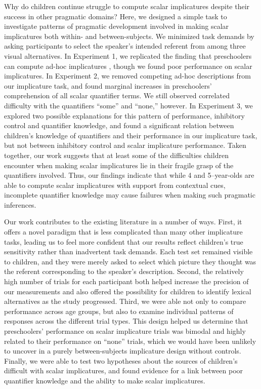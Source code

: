 \documentclass[man]{apa2}
\begin{document}
{Why do children continue struggle to compute scalar implicatures despite their success in other pragmatic domains? Here, we designed a simple task to investigate patterns of pragmatic development involved in making scalar implicatures both within- and between-subjects. We minimized task demands by asking participants to select the speaker's intended referent from among three visual alternatives. In Experiment 1, we replicated the finding that preschoolers can compute ad-hoc implicatures , though we found poor performance on scalar implicatures. In Experiment 2, we removed competing ad-hoc descriptions from our implicature task, and found marginal increases in preschoolers' comprehension of all scalar quantifier terms. We still observed correlated difficulty with the quantifiers ``some'' and ``none,'' however. In Experiment 3, we explored two possible explanations for this pattern of performance, inhibitory control and quantifier knowledge, and found a significant relation between children's knowledge of quantifiers and their performance in our implicature task, but not between inhibitory control and scalar implicature performance. Taken together, our work suggests that at least some of the difficulties children encounter when making scalar implicatures lie in their fragile grasp of the quantifiers involved. Thus, our findings indicate that while 4 and 5--year-olds are able to compute scalar implicatures with support from contextual cues, incomplete quantifier knowledge may cause failures when making such pragmatic inferences.

Our work contributes to the existing literature in a number of ways. First, it offers a novel paradigm that is less complicated than many other implicature tasks, leading us to feel more confident that our results reflect children's true sensitivity rather than inadvertent task demands. Each test set remained visible to children, and they were merely asked to select which picture they thought was the referent corresponding to the speaker's description. Second, the relatively high number of trials for each participant both helped increase the precision of our measurements and also offered the possibility for children to identify lexical alternatives as the study progressed. Third, we were able not only to compare performance across age groups, but also to examine individual patterns of responses across the different trial types. This design helped us determine that preschoolers' performance on scalar implicature trials was bimodal and highly related to their performance on ``none'' trials, which we would have been unlikely to uncover in a purely between-subjects implicature design without controls. Finally, we were able to test two hypotheses about the sources of children's difficult with scalar implicatures, and found evidence for a link between poor quantifier knowledge and the ability to make scalar implicatures.

}
\end{document}
